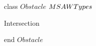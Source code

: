 






\begin{vdm}
{\small\sf class} $Obstacle$  \kISO $\index{MSAWTypes|ClassOcc}MSAWTypes$
\begin{methdef}
\begin{method}{Intersection}
\methvalue{\Bool 
}\\
\Iscr 
\end{method}
\end{methdef}
{\small\sf end} $Obstacle$

\end{vdm}
